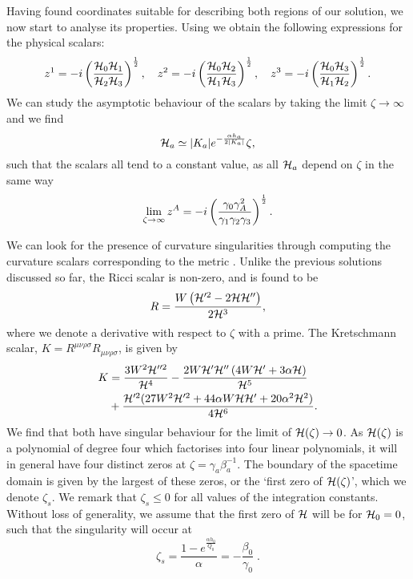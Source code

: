 Having found coordinates suitable for describing both regions of our solution, we now start to analyse its properties. Using  we obtain the following expressions for the physical scalars:
\begin{equation}
\label{eq:stuphysicalscalars}
  z^1 = -i \left( \frac{{\cal H}_0 {\cal H}_1 }{{\cal H}_2 {\cal H}_3} \right)^{\frac{1}{2}}, \quad z^2 = -i \left( \frac{{\cal H}_0 {\cal H}_2 }{{\cal H}_1 {\cal H}_3} \right)^{\frac{1}{2}}, \quad z^3 = -i \left( \frac{{\cal H}_0 {\cal H}_3 }{{\cal H}_1 {\cal H}_2} \right)^{\frac{1}{2}}.
\end{equation}
We can study the asymptotic behaviour of the scalars by taking the limit $\zeta \to \infty$ and we find
 \begin{equation*}
   {\cal H}_a \simeq | K_a | e^{-\frac{\alpha h_a}{2 |K_a|}} \zeta,
 \end{equation*}
such that the scalars all tend to a constant value, as all ${\cal H}_a$ depend on $\zeta$ in the same way
\begin{equation*}
	\lim_{\zeta \to \infty} z^A = -i \left( \frac{\gamma_0 \gamma_A^2}{\gamma_1\gamma_2\gamma_3} \right)^{\frac{1}{2}}.
\end{equation*}

We can look for the presence of curvature singularities through computing the curvature scalars corresponding to the metric . Unlike the previous solutions discussed so far, the Ricci scalar is non-zero, and is found to be
\begin{equation}
\label{eq:ricciscalar}
R = \frac{W \left({\cal H}^{\prime 2}-2 {\cal H} {\cal H}''\right)}{2 {\cal H}^3},
\end{equation}
where we denote a derivative with respect to $\zeta$ with a prime. The Kretschmann scalar, $K = R^{\mu \nu \rho \sigma}R_{\mu \nu \rho \sigma}$, is given by
\begin{equation}
\label{eq:krescalar}
\begin{aligned}
K &= \frac{3 W^2 {\cal H}''^2}{{\cal H}^4} - \frac{2 W {\cal H}' {\cal H}''
  \left(4W{\cal H}'+3 \alpha {\cal H}\right)}{{\cal H}^5}
\\ &+ \frac{{\cal H}'^2 (27
  W^2 {\cal H}'^2+ 44 \alpha W {\cal H} {\cal H}'+20 \alpha ^2
  {\cal H}^2)}{4{\cal H}^6}.
\end{aligned}
\end{equation}
We find that both have singular behaviour for the limit of ${\cal H}(\zeta) \rightarrow 0$. As ${\cal H}(\zeta)$ is a polynomial of degree four which factorises into four linear polynomials, it will in general have four distinct zeros at $\zeta = \gamma_a \beta_a^{-1}$. The boundary of the spacetime domain is given by the largest of these zeros, or the `first zero of ${\cal H}(\zeta)$', which we denote $\zeta_s$. We remark that $\zeta_s \leq 0$ for all values of the integration constants. Without loss of generality, we assume that the first zero of ${\cal H}$ will be for ${\cal H}_0=0$, such that the singularity will occur at
\begin{equation}
\label{eq:4csing}
    \zeta_s = \frac{1 - e^{\frac{\alpha h_0}{Q_0}}}{\alpha} = -\frac{\beta_0}{\gamma_0} \;.
\end{equation}

